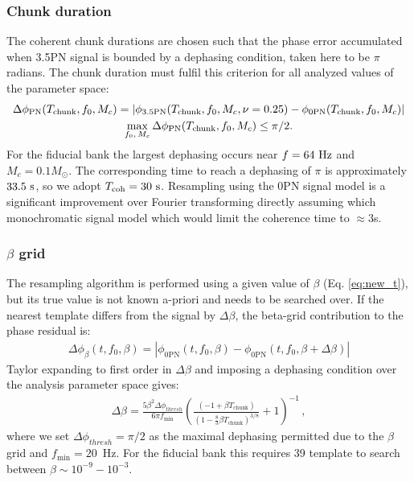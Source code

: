 \documentclass[aps,prd,amsmath,floats,floatfix, twocolumn,
superscriptaddress,nofootinbib,showpacs]{revtex4-2}
\begin{document}
\subsubsection{Chunk duration}
\label{sec:chunk_duration}
The coherent chunk durations are chosen such that the phase error accumulated when
3.5PN signal is bounded by a dephasing condition, taken here to be $\pi$ radians. The chunk duration must fulfil this criterion for all analyzed values of the parameter space:
\begin{gather}
    \Delta \phi_{\rm PN}(T_\mathrm{chunk}, f_0, M_c)
    =
    \left|
    \phi_{\rm 3.5PN}(T_\mathrm{chunk}, f_0, M_c, \nu=0.25)-\phi_{\rm 0PN}(T_\mathrm{chunk}, f_0, M_c)
    \right| 
    \\
    \max_{f_0, \, M_c} \Delta \phi_{\rm PN}(T_\mathrm{chunk}, f_0, M_c)
    \leq \pi/2 .
    \label{eq:chunk_size_condition}
\end{gather}
For the fiducial bank the largest dephasing occurs near
$f=64~{\rm Hz}$ and $M_c=0.1M_\odot$. The corresponding time to reach a dephasing
of $\pi$ is approximately $33.5~{\rm s}$, so we adopt
$T_{\rm coh}=30~{\rm s}$. Resampling using the 0PN signal model is a significant improvement over Fourier transforming directly assuming which monochromatic signal model which would limit the coherence time to $\approx 3$s. 


\subsubsection{$\beta$ grid}
\label{sec:beta_grid}
The resampling algorithm is performed using a given value of $\beta$ (Eq. \ref{eq:new_t}), but its true value is not known a-priori and needs to be searched over. If the nearest template differs from the signal by $\Delta \beta$, the beta-grid contribution to the phase residual is:
\begin{gather}
    \Delta \phi_\beta (t, f_0, \beta) = |\phi_\mathrm{0PN}(t, f_0, \beta) - \phi_\mathrm{0PN}(t, f_0, \beta+\Delta\beta)|
\end{gather}
Taylor expanding to first order in $\Delta \beta$ and imposing a dephasing condition over the analysis parameter space gives:
\begin{gather}
\Delta \beta = \frac{5\beta^2 \Delta \phi_{thresh}}{6\pi f_\mathrm{min}} \left( \frac{(-1+\beta T_\mathrm{chunk})}{(1-\frac{8}{3}\beta T_\mathrm{chunk})^{3/8}}+1\right)^{-1} \, , \label{eq:beta_phase_condition}
\end{gather}
where we set $\Delta \phi_{thresh}=\pi/2$ as the maximal dephasing permitted due to the $\beta$ grid and $f_\mathrm{min}=20$~Hz. For the fiducial bank this requires 39 template to search between $\beta\sim10^{-9}-10^{-3}$. 
\end{document}
